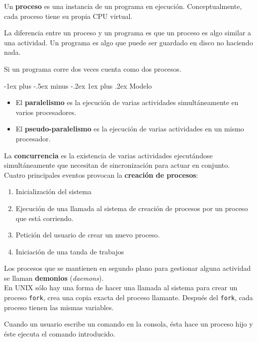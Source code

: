 \documentclass[10pt,portrait, twocolumn]{article}
\makeatletter
\renewcommand{\subsubsection}{\@startsection{subsubsection}{3}{0mm}%
                                {-1ex plus -.5ex minus -.2ex}%
                                {1ex plus .2ex}%
                                {\normalfont\small\bfseries}}
\makeatother
\begin{document}
Un \textbf{proceso} es una instancia de un programa en ejecución. Conceptualmente, cada proceso tiene su propia CPU virtual.

\quad La diferencia entre un proceso y un programa es que un proceso es algo similar a una actividad. Un programa es algo que puede ser guardado en disco no haciendo nada. 

\quad Si un programa corre dos veces cuenta como dos procesos.

\subsubsection{Modelo}

\begin{itemize}
\item El \textbf{paralelismo} es la ejecución de varias actividades simultáneamente en varios procesadores.
\item El \textbf{pseudo-paralelismo} es la ejecución de varias actividades en un mismo procesador.
\end{itemize}

La \textbf{concurrencia} es la existencia de varias actividades ejecutándose simultáneamente que necesitan de sincronización para actuar en conjunto.\\

Cuatro principales eventos provocan la \textbf{creación de procesos}:

	\begin{enumerate}
	\item Inicialización del sistema
	\item Ejecución de una llamada al sistema de creación de procesos por un proceso que está corriendo.
	\item Petición del usuario de crear un nuevo proceso.
	\item Iniciación de una tanda de trabajos
	\end{enumerate}
	
Los procesos que se mantienen en segundo plano para gestionar alguna actividad se llaman \textbf{demonios} (\textit{daemons}).\\

En UNIX sólo hay una forma de hacer una llamada al sistema para crear un proceso \texttt{fork}, crea una copia exacta del proceso llamante. Después del \texttt{fork}, cada proceso tienen las mismas variables.

	\quad Cuando un usuario escribe un comando en la consola, ésta hace un proceso hijo y éste ejecuta el comando introducido.\\
\end{document}
